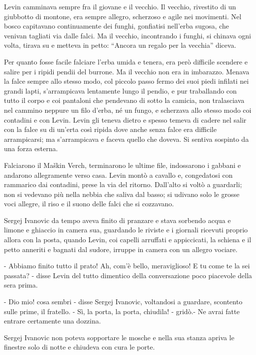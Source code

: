Levin camminava sempre fra il giovane e il vecchio. Il vecchio, rivestito di un giubbotto di montone, era sempre allegro, scherzoso e agile nei movimenti. Nel bosco capitavano continuamente dei funghi, gonfiatisi nell'erba sugosa, che venivan tagliati via dalle falci. Ma il vecchio, incontrando i funghi, si chinava ogni volta, tirava su e metteva in petto: ``Ancora un regalo per la vecchia'' diceva. 

Per quanto fosse facile falciare l'erba umida e tenera, era però difficile scendere e salire per i ripidi pendii del burrone. Ma il vecchio non era in imbarazzo. Menava la falce sempre allo stesso modo, col piccolo passo fermo dei suoi piedi infilati nei grandi lapti, s'arrampicava lentamente lungo il pendio, e pur traballando con tutto il corpo e coi pantaloni che pendevano di sotto la camicia, non tralasciava nel cammino neppure un filo d'erba, né un fungo, e scherzava allo stesso modo coi contadini e con Levin. Levin gli teneva dietro e spesso temeva di cadere nel salir con la falce su di un'erta così ripida dove anche senza falce era difficile arrampicarsi; ma s'arrampicava e faceva quello che doveva. Si sentiva sospinto da una forza esterna. 

Falciarono il Maškin Verch, terminarono le ultime file, indossarono i gabbani e andarono allegramente verso casa. Levin montò a cavallo e, congedatosi con rammarico dai contadini, prese la via del ritorno. Dall'alto si voltò a guardarli; non si vedevano più nella nebbia che saliva dal basso; si udivano solo le grosse voci allegre, il riso e il suono delle falci che si cozzavano. 

Sergej Ivanovic da tempo aveva finito di pranzare e stava sorbendo acqua e limone e ghiaccio in camera sua, guardando le riviste e i giornali ricevuti proprio allora con la posta, quando Levin, coi capelli arruffati e appiccicati, la schiena e il petto anneriti e bagnati dal sudore, irruppe in camera con un allegro vociare. 

- Abbiamo finito tutto il prato! Ah, com'è bello, meraviglioso! E tu come te la sei passata? - disse Levin del tutto dimentico della conversazione poco piacevole della sera prima. 

- Dio mio! cosa sembri - disse Sergej Ivanovic, voltandosi a guardare, scontento sulle prime, il fratello. - Sì, la porta, la porta, chiudila! - gridò.- Ne avrai fatte entrare certamente una dozzina. 

Sergej Ivanovic non poteva sopportare le mosche e nella sua stanza apriva le finestre solo di notte e chiudeva con cura le porte. 

